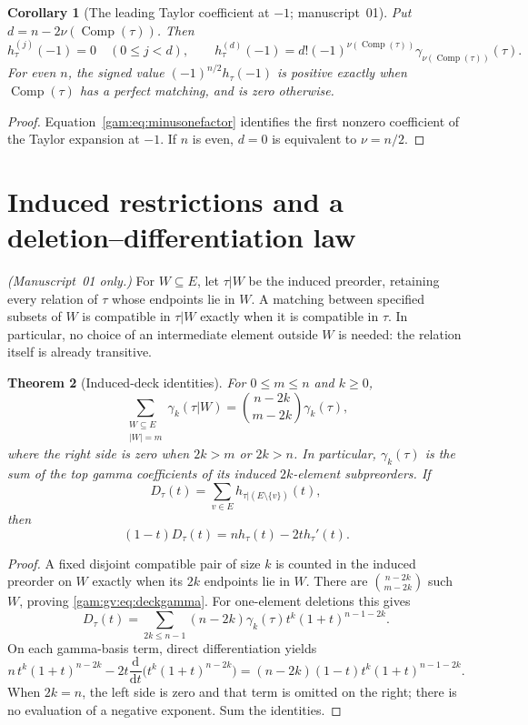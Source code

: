 \documentclass[11pt]{article}
\numberwithin{equation}{section}
\newtheorem{theorem}{Theorem}[section]
\newtheorem{corollary}[theorem]{Corollary}
\theoremstyle{definition}
\newcommand{\Comp}{\operatorname{Comp}}
\begin{document}
\begin{corollary}[The leading Taylor coefficient at $-1$; manuscript~01]\label{gam:gv:cor:derivative}
Put $d=n-2\nu(\Comp(\tau))$. Then
\begin{equation}
 h_\tau^{(j)}(-1)=0\quad(0\le j<d),\qquad
 h_\tau^{(d)}(-1)=d!(-1)^{\nu(\Comp(\tau))}\gamma_{\nu(\Comp(\tau))}(\tau).
 \label{gam:gv:eq:derivative}
\end{equation}
For even $n$, the signed value $(-1)^{n/2}h_\tau(-1)$ is positive exactly
when $\Comp(\tau)$ has a perfect matching, and is zero otherwise.
\end{corollary}
\begin{proof}
Equation~\eqref{gam:eq:minusonefactor} identifies the first nonzero coefficient
of the Taylor expansion at $-1$. If $n$ is even, $d=0$ is equivalent to
$\nu=n/2$.
\end{proof}

\section{Induced restrictions and a deletion--differentiation law}\label{gam:gv:sec:deck}
\noindent\emph{(Manuscript~01 only.)}
For $W\subseteq E$, let $\tau|W$ be the induced preorder, retaining every
relation of $\tau$ whose endpoints lie in $W$. A matching between specified
subsets of $W$ is compatible in $\tau|W$ exactly when it is compatible in
$\tau$. In particular, no choice of an intermediate element outside $W$
is needed: the relation itself is already transitive.

\begin{theorem}[Induced-deck identities]\label{gam:gv:thm:deck}
For $0\le m\le n$ and $k\ge0$,
\begin{equation}
 \sum_{\substack{W\subseteq E\\|W|=m}}\gamma_k(\tau|W)
   =\binom{n-2k}{m-2k}\gamma_k(\tau),
 \label{gam:gv:eq:deckgamma}
\end{equation}
where the right side is zero when $2k>m$ or $2k>n$.
In particular, $\gamma_k(\tau)$ is the sum of the top gamma coefficients of its
induced $2k$-element subpreorders. If
\[
 D_\tau(t)=\sum_{v\in E}h_{\tau|(E\setminus\{v\})}(t),
\]
then
\begin{equation}
 \boxed{(1-t)D_\tau(t)=n h_\tau(t)-2t h_\tau'(t).}
 \label{gam:gv:eq:deletiondifferential}
\end{equation}
\end{theorem}
\begin{proof}
A fixed disjoint compatible pair of size $k$ is counted in the induced
preorder on $W$ exactly when its $2k$ endpoints lie in $W$. There are
$\binom{n-2k}{m-2k}$ such $W$, proving \eqref{gam:gv:eq:deckgamma}.
For one-element deletions this gives
\[
 D_\tau(t)=\sum_{2k\le n-1}(n-2k)\gamma_k(\tau)
                      t^k(1+t)^{n-1-2k}.
\]
On each gamma-basis term, direct differentiation yields
\[
 n\,t^k(1+t)^{n-2k}
 -2t\frac{\mathrm d}{\mathrm dt}\bigl(t^k(1+t)^{n-2k}\bigr)
 =(n-2k)(1-t)t^k(1+t)^{n-1-2k}.
\]
When $2k=n$, the left side is zero and that term is omitted on the right;
there is no evaluation of a negative exponent. Sum the identities.
\end{proof}
\end{document}
